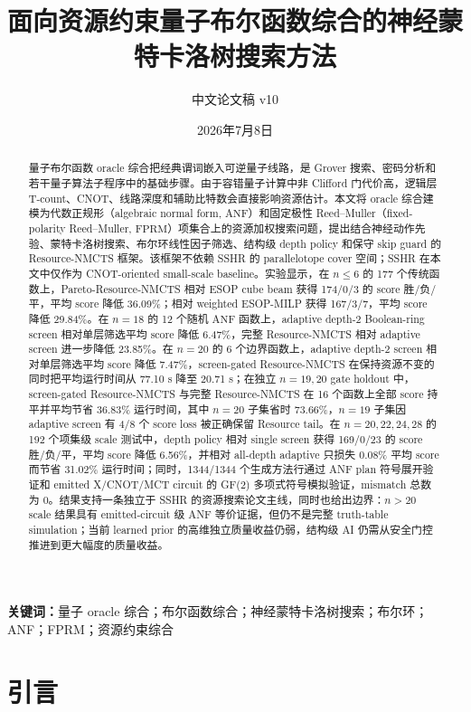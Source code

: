 \documentclass[UTF8,fontset=macnew,11pt]{ctexart}
\title{面向资源约束量子布尔函数综合的神经蒙特卡洛树搜索方法}
\author{中文论文稿 v10}
\date{2026年7月8日}
\newcommand{\method}{Resource-NMCTS}
\newcommand{\pareto}{Pareto-Resource-NMCTS}
\newcommand{\screen}{Boolean-ring screen}
\newcommand{\anf}{\ensuremath{\mathrm{ANF}}}
\newcommand{\fprm}{\ensuremath{\mathrm{FPRM}}}
\begin{document}
\pagestyle{plain}
\maketitle

\begin{abstract}
量子布尔函数 oracle 综合把经典谓词嵌入可逆量子线路，是 Grover 搜索、密码分析和若干量子算法子程序中的基础步骤。由于容错量子计算中非 Clifford 门代价高，逻辑层 T-count、CNOT、线路深度和辅助比特数会直接影响资源估计。本文将 oracle 综合建模为代数正规形（algebraic normal form, \anf{}）和固定极性 Reed--Muller（fixed-polarity Reed--Muller, \fprm{}）项集合上的资源加权搜索问题，提出结合神经动作先验、蒙特卡洛树搜索、布尔环线性因子筛选、结构级 depth policy 和保守 skip guard 的 \method{} 框架。该框架不依赖 SSHR 的 parallelotope cover 空间；SSHR 在本文中仅作为 CNOT-oriented small-scale baseline。实验显示，在 $n\leq6$ 的 177 个传统函数上，\pareto{} 相对 ESOP cube beam 获得 174/0/3 的 score 胜/负/平，平均 score 降低 36.09\%；相对 weighted ESOP-MILP 获得 167/3/7，平均 score 降低 29.84\%。在 $n=18$ 的 12 个随机 \anf{} 函数上，adaptive depth-2 \screen{} 相对单层筛选平均 score 降低 6.47\%，完整 \method{} 相对 adaptive screen 进一步降低 23.85\%。在 $n=20$ 的 6 个边界函数上，adaptive depth-2 screen 相对单层筛选平均 score 降低 7.47\%，screen-gated \method{} 在保持资源不变的同时把平均运行时间从 77.10 s 降至 20.71 s；在独立 $n=19,20$ gate holdout 中，screen-gated \method{} 与完整 \method{} 在 16 个函数上全部 score 持平并平均节省 36.83\% 运行时间，其中 $n=20$ 子集省时 73.66\%，$n=19$ 子集因 adaptive screen 有 4/8 个 score loss 被正确保留 Resource tail。在 $n=20,22,24,28$ 的 192 个项集级 scale 测试中，depth policy 相对 single screen 获得 169/0/23 的 score 胜/负/平，平均 score 降低 6.56\%，并相对 all-depth adaptive 只损失 0.08\% 平均 score 而节省 31.02\% 运行时间；同时，1344/1344 个生成方法行通过 ANF plan 符号展开验证和 emitted X/CNOT/MCT circuit 的 GF(2) 多项式符号模拟验证，mismatch 总数为 0。结果支持一条独立于 SSHR 的资源搜索论文主线，同时也给出边界：$n>20$ scale 结果具有 emitted-circuit 级 ANF 等价证据，但仍不是完整 truth-table simulation；当前 learned prior 的高维独立质量收益仍弱，结构级 AI 仍需从安全门控推进到更大幅度的质量收益。
\end{abstract}

\noindent\textbf{关键词：}量子 oracle 综合；布尔函数综合；神经蒙特卡洛树搜索；布尔环；ANF；FPRM；资源约束综合

\section{引言}
\end{document}
